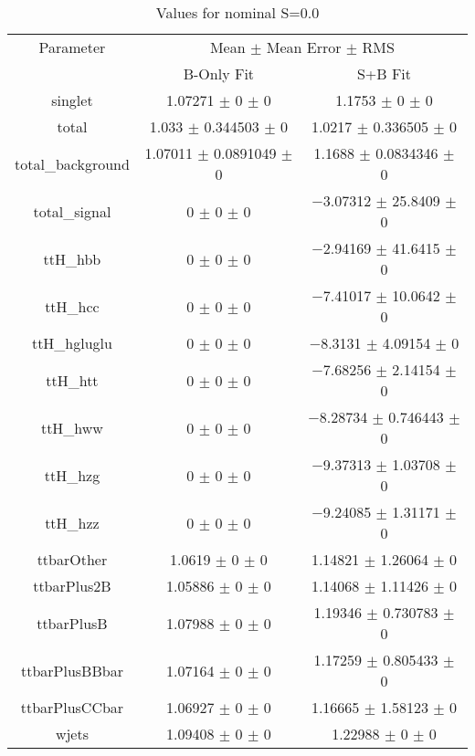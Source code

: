\begin{table}
\centering
\caption{Values for nominal S=0.0}
\begin{tabular}{ccc}
\toprule
Parameter & \multicolumn{2}{c}{Mean $\pm$ Mean Error $\pm$ RMS}\\
 & B-Only Fit & S+B Fit\\
\midrule
singlet & \num{1.07271} $\pm$ \num{0} $\pm$ \num{0} & \num{1.1753} $\pm$ \num{0} $\pm$ \num{0}\\
total & \num{1.033} $\pm$ \num{0.344503} $\pm$ \num{0} & \num{1.0217} $\pm$ \num{0.336505} $\pm$ \num{0}\\
total\_background & \num{1.07011} $\pm$ \num{0.0891049} $\pm$ \num{0} & \num{1.1688} $\pm$ \num{0.0834346} $\pm$ \num{0}\\
total\_signal & \num{0} $\pm$ \num{0} $\pm$ \num{0} & \num{-3.07312} $\pm$ \num{25.8409} $\pm$ \num{0}\\
ttH\_hbb & \num{0} $\pm$ \num{0} $\pm$ \num{0} & \num{-2.94169} $\pm$ \num{41.6415} $\pm$ \num{0}\\
ttH\_hcc & \num{0} $\pm$ \num{0} $\pm$ \num{0} & \num{-7.41017} $\pm$ \num{10.0642} $\pm$ \num{0}\\
ttH\_hgluglu & \num{0} $\pm$ \num{0} $\pm$ \num{0} & \num{-8.3131} $\pm$ \num{4.09154} $\pm$ \num{0}\\
ttH\_htt & \num{0} $\pm$ \num{0} $\pm$ \num{0} & \num{-7.68256} $\pm$ \num{2.14154} $\pm$ \num{0}\\
ttH\_hww & \num{0} $\pm$ \num{0} $\pm$ \num{0} & \num{-8.28734} $\pm$ \num{0.746443} $\pm$ \num{0}\\
ttH\_hzg & \num{0} $\pm$ \num{0} $\pm$ \num{0} & \num{-9.37313} $\pm$ \num{1.03708} $\pm$ \num{0}\\
ttH\_hzz & \num{0} $\pm$ \num{0} $\pm$ \num{0} & \num{-9.24085} $\pm$ \num{1.31171} $\pm$ \num{0}\\
ttbarOther & \num{1.0619} $\pm$ \num{0} $\pm$ \num{0} & \num{1.14821} $\pm$ \num{1.26064} $\pm$ \num{0}\\
ttbarPlus2B & \num{1.05886} $\pm$ \num{0} $\pm$ \num{0} & \num{1.14068} $\pm$ \num{1.11426} $\pm$ \num{0}\\
ttbarPlusB & \num{1.07988} $\pm$ \num{0} $\pm$ \num{0} & \num{1.19346} $\pm$ \num{0.730783} $\pm$ \num{0}\\
ttbarPlusBBbar & \num{1.07164} $\pm$ \num{0} $\pm$ \num{0} & \num{1.17259} $\pm$ \num{0.805433} $\pm$ \num{0}\\
ttbarPlusCCbar & \num{1.06927} $\pm$ \num{0} $\pm$ \num{0} & \num{1.16665} $\pm$ \num{1.58123} $\pm$ \num{0}\\
wjets & \num{1.09408} $\pm$ \num{0} $\pm$ \num{0} & \num{1.22988} $\pm$ \num{0} $\pm$ \num{0}\\
\bottomrule
\end{tabular}
\end{table}